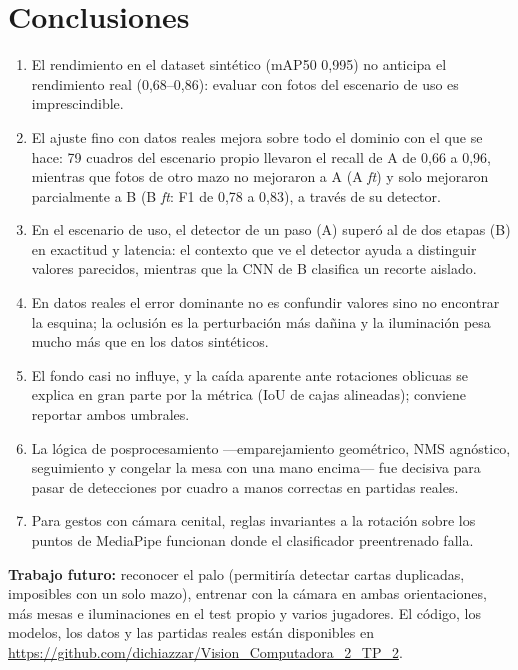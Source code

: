 \documentclass[conference,a4paper]{IEEEtran}
\begin{document}
\section{Conclusiones}
\begin{enumerate}
\item El rendimiento en el dataset sintético (mAP50 0,995) no anticipa el rendimiento real (0,68--0,86): evaluar con
fotos del escenario de uso es imprescindible.
\item El ajuste fino con datos reales mejora sobre todo el dominio con el que se hace: 79 cuadros del escenario
propio llevaron el recall de A de 0,66 a 0,96, mientras que fotos de otro mazo no mejoraron a A (A \emph{ft}) y solo
mejoraron parcialmente a B (B \emph{ft}: F1 de 0,78 a 0,83), a través de su detector.
\item En el escenario de uso, el detector de un paso (A) superó al de dos etapas (B) en exactitud y latencia: el contexto que ve el detector
ayuda a distinguir valores parecidos, mientras que la CNN de B clasifica un recorte aislado.
\item En datos reales el error dominante no es confundir valores sino no encontrar la esquina; la oclusión es la
perturbación más dañina y la iluminación pesa mucho más que en los datos sintéticos.
\item El fondo casi no influye, y la caída aparente ante rotaciones oblicuas se explica en gran parte por la métrica
(IoU de cajas alineadas); conviene reportar ambos umbrales.
\item La lógica de posprocesamiento ---emparejamiento geométrico, NMS agnóstico, seguimiento y congelar la mesa con
una mano encima--- fue decisiva para pasar de detecciones por cuadro a manos correctas en partidas reales.
\item Para gestos con cámara cenital, reglas invariantes a la rotación sobre los puntos de MediaPipe funcionan donde el
clasificador preentrenado falla.
\end{enumerate}
\textbf{Trabajo futuro:} reconocer el palo (permitiría detectar cartas duplicadas, imposibles con un solo mazo),
entrenar con la cámara en ambas orientaciones, más mesas e iluminaciones en el test propio y varios jugadores.
El código, los modelos, los datos y las partidas reales están disponibles en
\url{https://github.com/dichiazzar/Vision_Computadora_2_TP_2}.



\end{document}
